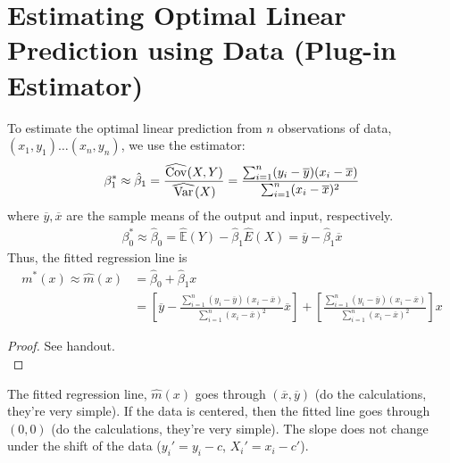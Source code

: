 \documentclass{article}
\newcommand{\E}{\mathbb{E}}
\newcommand{\xbar}{\overline{x}}
\newcommand{\ybar}{\overline{y}}
\newcommand{\sumiton}{\sum_{i=1}^n}
\newcommand\reallywidehat[1]{%
\savestack{\tmpbox}{\stretchto{%
  \scaleto{%
    \scalerel*[\widthof{\ensuremath{#1}}]{\kern-.6pt\bigwedge\kern-.6pt}%
    {\rule[-\textheight/2]{1ex}{\textheight}}%
  }{\textheight}%
}{0.5ex}}%
\stackon[1pt]{#1}{\tmpbox}%
}
\begin{document}
\section{Estimating Optimal Linear Prediction using Data (Plug-in Estimator)}
To estimate the optimal linear prediction from $n$ observations of data, $(x_1,y_1) \ldots (x_n,y_n)$, we use the estimator:
\begin{align}
    \beta_1^* \approx \hat{\beta}_1 = \frac{\reallywidehat{Cov}(X,Y)}{\reallywidehat{Var}(X)} = \frac{\sumiton (y_i - \ybar)(x_i - \xbar)}{\sumiton(x_i - \xbar)^2}
\end{align}
where $\ybar,\xbar$ are the sample means of the output and input, respectively.
\begin{align}
    \beta_0^* \approx \hat{\beta}_0 = \hat{\E}(Y) - \hat{\beta}_1\hat{E}(X) = \ybar - \hat{\beta}_1\xbar
\end{align}
Thus, the fitted regression line is
\begin{align}
    m^*(x) \approx \hat{m}(x) &= \hat{\beta}_0 + \hat{\beta}_1x\\
    &= \left[\ybar - \frac{\sumiton (y_i - \ybar)(x_i - \xbar)}{\sumiton(x_i - \xbar)^2}\xbar
    \right] + \left[\frac{\sumiton (y_i - \ybar)(x_i - \xbar)}{\sumiton(x_i - \xbar)^2}\right]x
\end{align}
\begin{proof}
    See handout.\\
\end{proof}
\bigbreak\noindent The fitted regression line, $\hat{m}(x)$ goes through $(\xbar,\ybar)$ (do the calculations, they're very simple).
\bigbreak\noindent If the data is centered, then the fitted line goes through $(0,0)$ (do the calculations, they're very simple).
\bigbreak\noindent The slope does not change under the shift of the data ($y_i' = y_i - c$, $X_i' = x_i - c'$).
\end{document}

